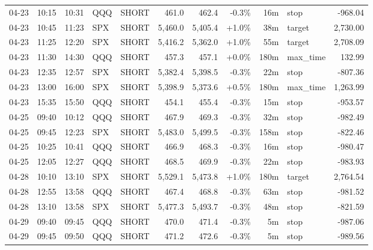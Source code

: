 \documentclass[11pt,a4paper,twoside]{article}
\begin{document}
\begin{center}
\begin{longtable}{>{\color{txtmain}}l l l l l r r r r >{\color{txtmain}}l r}
04-23 & 10:15 & 10:31 & QQQ & SHORT & 461.0 & 462.4 & \textcolor{lossred}{-0.3\%} & 16m & stop & \textcolor{lossred}{-968.04} \\
04-23 & 10:45 & 11:23 & SPX & SHORT & 5,460.0 & 5,405.4 & \textcolor{wingreen}{+1.0\%} & 38m & target & \textcolor{wingreen}{2,730.00} \\
04-23 & 11:25 & 12:20 & SPX & SHORT & 5,416.2 & 5,362.0 & \textcolor{wingreen}{+1.0\%} & 55m & target & \textcolor{wingreen}{2,708.09} \\
04-23 & 11:30 & 14:30 & QQQ & SHORT & 457.3 & 457.1 & \textcolor{wingreen}{+0.0\%} & 180m & max\_time & \textcolor{wingreen}{132.99} \\
04-23 & 12:35 & 12:57 & SPX & SHORT & 5,382.4 & 5,398.5 & \textcolor{lossred}{-0.3\%} & 22m & stop & \textcolor{lossred}{-807.36} \\
04-23 & 13:00 & 16:00 & SPX & SHORT & 5,398.9 & 5,373.6 & \textcolor{wingreen}{+0.5\%} & 180m & max\_time & \textcolor{wingreen}{1,263.99} \\
04-23 & 15:35 & 15:50 & QQQ & SHORT & 454.1 & 455.4 & \textcolor{lossred}{-0.3\%} & 15m & stop & \textcolor{lossred}{-953.57} \\
04-25 & 09:40 & 10:12 & QQQ & SHORT & 467.9 & 469.3 & \textcolor{lossred}{-0.3\%} & 32m & stop & \textcolor{lossred}{-982.49} \\
04-25 & 09:45 & 12:23 & SPX & SHORT & 5,483.0 & 5,499.5 & \textcolor{lossred}{-0.3\%} & 158m & stop & \textcolor{lossred}{-822.46} \\
04-25 & 10:25 & 10:41 & QQQ & SHORT & 466.9 & 468.3 & \textcolor{lossred}{-0.3\%} & 16m & stop & \textcolor{lossred}{-980.47} \\
04-25 & 12:05 & 12:27 & QQQ & SHORT & 468.5 & 469.9 & \textcolor{lossred}{-0.3\%} & 22m & stop & \textcolor{lossred}{-983.93} \\
04-28 & 10:10 & 13:10 & SPX & SHORT & 5,529.1 & 5,473.8 & \textcolor{wingreen}{+1.0\%} & 180m & target & \textcolor{wingreen}{2,764.54} \\
04-28 & 12:55 & 13:58 & QQQ & SHORT & 467.4 & 468.8 & \textcolor{lossred}{-0.3\%} & 63m & stop & \textcolor{lossred}{-981.52} \\
04-28 & 13:10 & 13:58 & SPX & SHORT & 5,477.3 & 5,493.7 & \textcolor{lossred}{-0.3\%} & 48m & stop & \textcolor{lossred}{-821.59} \\
04-29 & 09:40 & 09:45 & QQQ & SHORT & 470.0 & 471.4 & \textcolor{lossred}{-0.3\%} & 5m & stop & \textcolor{lossred}{-987.06} \\
04-29 & 09:45 & 09:50 & QQQ & SHORT & 471.2 & 472.6 & \textcolor{lossred}{-0.3\%} & 5m & stop & \textcolor{lossred}{-989.56} \\

\end{longtable}
\end{center}
\end{document}
